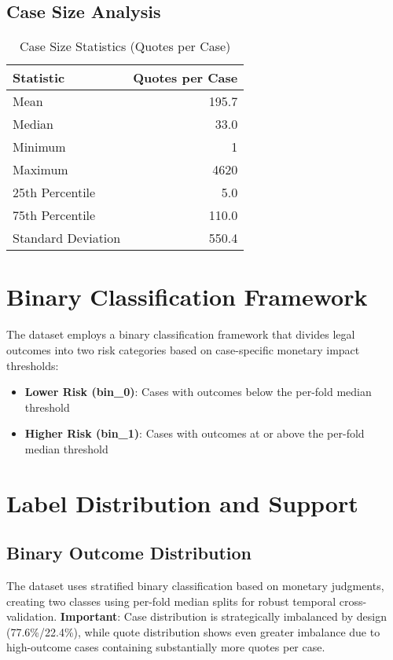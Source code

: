 \documentclass[11pt,a4paper]{article}
\begin{document}
\subsection{Case Size Analysis}

\begin{table}[H]
\centering
\caption{Case Size Statistics (Quotes per Case)}
\begin{tabular}{lr}
\toprule
\textbf{Statistic} & \textbf{Quotes per Case} \\
\midrule
Mean & 195.7 \\
Median & 33.0 \\
Minimum & 1 \\
Maximum & 4620 \\
25th Percentile & 5.0 \\
75th Percentile & 110.0 \\
Standard Deviation & 550.4 \\
\bottomrule
\end{tabular}
\end{table}

\section{Binary Classification Framework}

The dataset employs a binary classification framework that divides legal outcomes into two risk categories based on case-specific monetary impact thresholds:

\begin{itemize}
\item \textbf{Lower Risk (bin\_0)}: Cases with outcomes below the per-fold median threshold
\item \textbf{Higher Risk (bin\_1)}: Cases with outcomes at or above the per-fold median threshold
\end{itemize}

\section{Label Distribution and Support}

\subsection{Binary Outcome Distribution}

The dataset uses stratified binary classification based on monetary judgments, creating two classes using per-fold median splits for robust temporal cross-validation. \textbf{Important}: Case distribution is strategically imbalanced by design (77.6\%/22.4\%), while quote distribution shows even greater imbalance due to high-outcome cases containing substantially more quotes per case.
\end{document}
